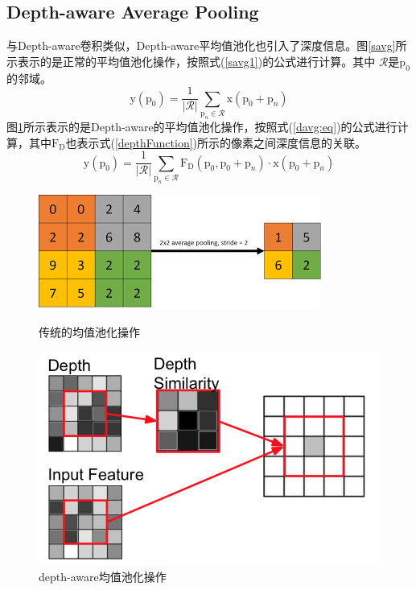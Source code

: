 \documentclass[cn]{elegantbook}
\begin{document}
\subsection{Depth-aware Average Pooling}
与Depth-aware卷积类似，Depth-aware平均值池化也引入了深度信息。图\ref{savg}所示表示的是正常的平均值池化操作，按照式(\ref{savg1})的公式进行计算。其中 $\mathcal{R}$是$\mathrm{p}_0$的邻域。
\begin{equation}
\label{savg1}
\mathrm{y}(\mathrm{p}_0)=\frac{1}{|\mathcal{R}|}\sum_{\mathrm{p}_n\in \mathcal{R}} \mathrm{x}(\mathrm{p}_0+\mathrm{p}_n)
\end{equation}
图\ref{davg}所示表示的是Depth-aware的平均值池化操作，按照式(\ref{davg:eq})的公式进行计算，其中$\mathrm{F_D}$也表示式(\ref{depthFunction})所示的像素之间深度信息的关联。
\begin{equation}
\label{davg:eq}
\mathrm{y}(\mathrm{p}_0)=\frac{1}{|\mathcal{R}|}\sum_{\mathrm{p}_n\in \mathcal{R}} \mathrm{F_D}(\mathrm{p}_0,\mathrm{p}_0+\mathrm{p}_n)\cdot\mathrm{x}(\mathrm{p}_0+\mathrm{p}_n)
\end{equation}
\begin{figure}[h]
	\centering
	\begin{minipage}[t]{0.4\textwidth}
		\centering
		\includegraphics[width=\textwidth]{images/savg.png}
		\caption{\label{savg}传统的均值池化操作}
	\end{minipage}
	\begin{minipage}[t]{0.4\textwidth}
		\centering
		\includegraphics[width=\textwidth]{images/davg.png}
		\caption{\label{davg}depth-aware均值池化操作}
	\end{minipage}
\end{figure}
\end{document}
